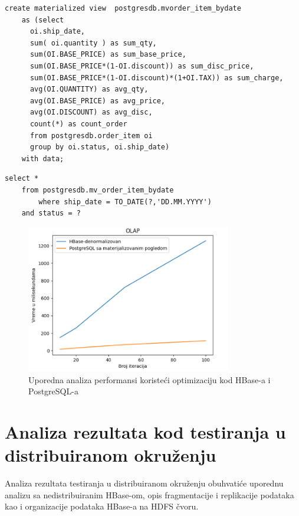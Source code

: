 \documentclass[12pt,oneside]{memoir}
\begin{document}
\pagebreak 

\begin{lstlisting}[title={mvorder\_item\_bydate - Kreiranje materijalizovanog pogleda},captionpos=b]
create materialized view  postgresdb.mvorder_item_bydate
    as (select
	  oi.ship_date,
	  sum( oi.quantity ) as sum_qty,
	  sum(OI.BASE_PRICE) as sum_base_price,
	  sum(OI.BASE_PRICE*(1-OI.discount)) as sum_disc_price,
	  sum(OI.BASE_PRICE*(1-OI.discount)*(1+OI.TAX)) as sum_charge,
	  avg(OI.QUANTITY) as avg_qty,
	  avg(OI.BASE_PRICE) as avg_price,
	  avg(OI.DISCOUNT) as avg_disc,
	  count(*) as count_order
	  from postgresdb.order_item oi
	  group by oi.status, oi.ship_date)
	with data;
 \end{lstlisting}

\begin{lstlisting}[title={executeOLAPQuery - OLAP upit koristeći materijalizovani pogled},captionpos=b]
select *
	from postgresdb.mv_order_item_bydate
        where ship_date = TO_DATE(?,'DD.MM.YYYY')
	and status = ?
 \end{lstlisting}


\begin{figure}[!ht]
  \centering
  \includegraphics[width=0.8\textwidth]{mv-denormalizerd.png}
  \caption{Uporedna analiza performansi koristeći optimizaciju kod HBase-a  i PostgreSQL-a}
  \label{fig:grafikon}
\end{figure}


\section{Analiza rezultata kod testiranja u distribuiranom okruženju}

Analiza rezultata testiranja u distribuiranom okruženju obuhvatiće uporednu analizu sa nedistribuiranim HBase-om, opis fragmentacije i replikacije podataka kao i organizacije podataka HBase-a na HDFS čvoru. 
\end{document}
